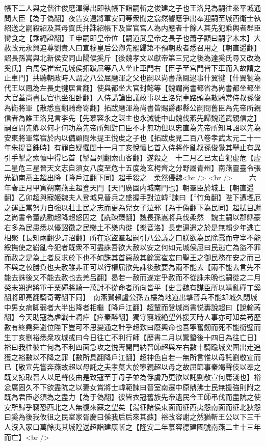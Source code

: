帳下二人與之偕往俊磨渾得出即執帳下詣嗣斬之俊建之子也王洛兒為嗣往來平城通問大臣【為于偽翻】夜告安遠將軍安同等衆聞之翕然響應爭出奉迎嗣至城西衛士執紹送之嗣殺紹及其母賀氏并誅紹帳下及宦官宫人為内應者十餘人其先犯乘輿者群臣臠食之【乘繩證翻】壬申嗣即皇帝位【嗣道武皇帝之長子也蕭子顯曰嗣字木末】大赦改元永興追尊劉貴人曰宣穆皇后公卿先罷歸第不預朝政者悉召用之【朝直遥翻】詔長孫嵩與北新侯安同山陽侯奚斤【後魏孝文以獻帝第三兄之後為達奚氏尋又改為奚氏】白馬侯崔宏元城侯拓跋屈等八人坐止車門右【臣子至宫門皆下車而入故謂之止車門】共聽朝政時人謂之八公屈磨渾之父也嗣以尚書燕鳳逮事什翼犍【什翼犍為代王以鳳為左長史犍居言翻】使與都坐大官封懿等【魏謂尚書都省為尚書都坐都坐大官蓋尚書長官也坐徂卧翻】入侍講論出議政事以王洛兒車路頭為散騎常侍叔孫俊為衛將軍【散悉亶翻騎奇寄翻】拓跋磨渾為尚書皆賜爵郡縣公嗣問舊臣為先帝所親信者為誰王洛兒言李先【先慕容永之謀主也永滅徙中山魏伐燕先歸魏道武親信之】嗣召問先卿以何才何功為先帝所知對曰臣不才無功但以忠直為先帝所知耳詔以先為安東將軍常宿於内以備顧問朱提王悦䖍之子也【拓跋䖍見二百八卷孝武太元二十一年朱提音銖時】有罪自疑懼閏十一月丁亥悅懷匕首入侍將作亂叔孫俊覺其舉止有異引手掣之索懷中得匕首【掣昌列翻索山客翻】遂殺之　十二月乙巳太白犯虚危【虚二星危三星晉天文志自須女八度至危十五度為玄枵齊之分野屬青州】南燕靈臺令張光勸南燕主超出降【降戶江翻下同】超手殺之　柔然侵魏<br />
<br />
　　六年春正月甲寅朔南燕主超登天門【天門廣固内城南門也】朝羣臣於城上【朝直遥翻】乙卯超與寵姬魏夫人登城見晉兵之盛握手對泣韓諫曰【竹角翻】陛下遭堙厄之運正當努力自強以壯士民之志而更為兒女子泣邪【為于偽翻下為民同】超拭目謝之尚書令董詵勸超降超怒囚之【詵疎臻翻】魏長孫嵩將兵伐柔然　魏主嗣以郡縣豪右多為民患悉以優詔徵之民戀土不樂内徙【樂音洛】長吏逼遣之於是無賴少年逃亡相聚【長知兩翻少詩沼翻】所在寇盜羣起嗣引八公議之曰朕欲為民除蠧而守宰不能綏撫使之紛亂今犯者既衆不可盡誅吾欲大赦以安之何如元城侯屈曰民逃亡為盜不罪而赦之是為上者反求於下也不如誅其首惡赦其餘黨崔宏曰聖王之御民務在安之而已不與之較勝負也夫赦雖非正可以行權屈欲先誅後赦要為兩不能去【兩不能去言先不能去誅後又不能去赦也去羌呂翻】曷若一赦而遂定乎赦而不從誅未晩也嗣從之二月癸未朔遣將軍于栗磾將騎一萬討不從命者所向皆平【史言魏有謀臣所以靖亂磾丁奚翻將即亮翻騎奇寄翻下同】　南燕賀賴盧公孫五樓為地道出擊晉兵不能却城久閉城中男女病脚弱者大半出降者相繼【降戶江翻】超輦而登城尚書悦夀說超曰【說輸芮翻】今天助寇為虐戰士凋瘁【瘁秦醉翻】獨守窮城絶望外援天時人事亦可知矣苟歷數有終堯舜避位陛下豈可不思變通之計乎超歎曰廢興命也吾寜奮劒而死不能銜璧而生丁亥劉裕悉衆攻城或曰今日往亡不利行師【歷書二月以驚蟄後十四日為往亡日】裕曰我往彼亡何為不利四面急攻之悦夀開門納晉師超與左右數十騎踰城突圍出走追獲之裕數以不降之罪【數所具翻降戶江翻】超神色自若一無所言惟以母託劉敬宣而已【敬宣先嘗奔燕故超以母託之夫孝莫大於寧親超以母之故屈節事秦竭聲伎以奉之既又掠取晉人以足聲伎由是致寇至于母子並為俘虜乃更欲以託劉敬宣何庸淺也】裕忿廣固久不下欲盡阬之以妻女賞將士韓範諫曰晉室南遷中原鼎沸士民無援強則附之既為君臣必須為之盡力【為于偽翻】彼皆衣冠舊族先帝遺民今王師弔伐而盡阬之使安所歸乎竊恐西北之人無復來蘇之望矣【湯征諸侯東面而征西夷怨南面而征北狄怨曰奚為後我攸徂之民室家胥慶曰傒我后后來其蘇】裕改容謝之然猶斬王公以下三千人沒入家口萬餘夷其城隍送超詣建康斬之【隆安二年慕容德建國號南燕二主十三年而亡】<br />
